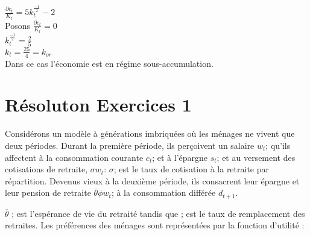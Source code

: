 \documentclass[11pt,twoside,a4paper]{article}
\begin{document}
 $\frac{\partial c_t}{K_t}=5k_t^\frac{-1}{2}-2$\\
 
  Posons $\frac{\partial c_t}{K_t}=0$\\
  $k_t^\frac{-1}{2}=\frac{2}{5}$\\
  $k_t=\frac{25}{4}=k_{or}$\\
  Dans ce cas l'économie est en régime sous-accumulation.\\
  
  \section*{Résoluton Exercices 1}
  
  Considérons un modèle à générations imbriquées où les ménages ne vivent que deux périodes. Durant la première période, ils perçoivent un salaire $w_t$; qu'ils affectent à la  consommation courante $c_t$; et à l'épargne $s_t$; et au versement des cotisations de retraite, $\sigma w_t$: $\sigma$; est le taux de cotisation à la retraite par répartition. Devenus vieux à la deuxième période, ils consacrent leur épargne et leur pension de retraite $\overline{\theta}\phi w_t$; à la consommation différée $d_{t+1}$.

$\overline{\theta}$ ; est l'espérance de vie du retraité tandis que ; est le taux de remplacement
des retraites. Les préférences des ménages sont représentées par la fonction d'utilité :


  
 
\end{document}
